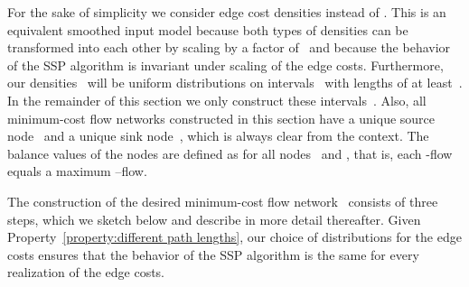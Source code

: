 \documentclass[11pt]{article}
\begin{document}
For the sake of simplicity we consider edge cost densities  instead of . This is an equivalent
smoothed input model because both types of densities can be transformed into
each other by scaling by a factor of~ and because the behavior of the SSP
algorithm is invariant under scaling of the edge costs. Furthermore, our
densities~ will be uniform distributions on intervals~ with lengths of
at least~. In the remainder of this section we only construct these
intervals~. Also, all minimum-cost flow networks constructed in this
section have a unique source node~ and a unique sink node~, which is
always clear from the context. The balance values of the nodes are defined as
 for all nodes~ and , that is, each -flow equals a maximum
--flow.

The construction of the desired minimum-cost flow network~ consists of three steps,
which we sketch below and describe in more detail thereafter. Given Property~\ref{property:different path lengths}, our choice of distributions for the edge costs ensures that the behavior of the SSP algorithm is the same for every realization of the edge costs.
\end{document}
